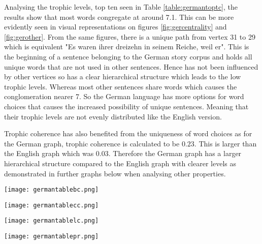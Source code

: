 Analysing the trophic levels, top ten seen in Table \ref{table:germantoptc}, the results show that most words congregate at around 7.1. This can be more evidently seen in visual representations on figures \ref{fig:gercentrality} and \ref{fig:gerother}. From the same figures, there is a unique path from vertex 31 to 29 which is equivalent "Es waren ihrer dreizehn in seinem Reiche, weil er". This is the beginning of a sentence belonging to the German story corpus and holds all unique words that are not used in other sentences. Hence has not been influenced by other vertices so has a clear hierarchical structure which leads to the low trophic levels. Whereas most other sentences share words which causes the conglomeration nearer 7. So the German language has more options for word choices that causes the increased possibility of unique sentences. Meaning that their trophic levels are not evenly distributed like the English version. 

Trophic coherence has also benefited from the uniqueness of word choices as for the German graph, trophic coherence is calculated to be $0.23$. This is larger than the English graph which was 0.03. Therefore the German graph has a larger hierarchical structure compared to the English graph with clearer levels as demonstrated in further graphs below when analysing other properties.

\begin{table}[H]
\centering
\begin{subtable}{.2\textwidth}
	\centering
	\texttt{[image: germantablebc.png]}
	\caption{}
	\label{table:germantablebc}
\end{subtable}
\hfill
\begin{subtable}{.2\textwidth}
	\centering
	\texttt{[image: germantablecc.png]}
	\caption{}
	\label{table:germantablecc}
\end{subtable}
\hfill
\begin{subtable}{.2\textwidth}
	\centering
	\texttt{[image: germantablelc.png]}
	\caption{}
	\label{table:germantablelc}
\end{subtable}
\hfill
\begin{subtable}{.2\textwidth}
	\centering
	\texttt{[image: germantablepr.png]}
	\caption{}
	\label{table:germantablepr}
\end{subtable}
\caption{}
\end{table}

